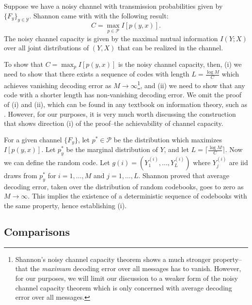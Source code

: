Suppose we have a noisy channel with transmission probabilities given by $\{F_y\}_{y \in \mathcal{Y}}$.
Shannon came with with the following result:
\[
C = \max_{p\in \mathcal{P}} I[p(y, x)].
\]
The noisy channel capacity is given by the maximal mutual information
$I(Y; X)$ over all joint distributions of $(Y, X)$ that can be
realized in the channel.

To show that $C = \max_p I[p(y, x)]$ is the noisy channel capacity,
then, (i) we need to show that there exists a sequence of codes with
length $L = \frac{\log M}{C}$ which achieves vanishing decoding error
as $M \to \infty$\footnote{Shannon's noisy channel capacity theorem
  shows a much stronger property--that the \emph{maximum} decoding
  error over all messages has to vanish.  However, for our purposes,
  we will limit our discussion to a weaker form of the noisy channel
  capacity theorem which is only concerned with average decoding error
  over all messages.}, and (ii) we need to show that any code with a
shorter length has non-vanishing decoding error.  We omit the proof of
(i) and (ii), which can be found in any textbook on information
theory, such as \cite{Cover2006}.  However, for our purposes, it is
very much worth discussing the construction that shows direction (i)
of the proof--the achievability of channel capacity.

For a given channel $\{F_y\}$, let $p^* \in \mathcal{P}$ be the
distribution which maximizes $I[p(y, x)]$.  Let $p^*_y$ be the
marginal distribution of $Y$, and let $L = \lceil \frac{\log M}{C}
\rceil$.  Now we can define the random code.  Let $g(i) =
(Y_1^{(i)},\hdots, Y_L^{(i)})$ where $Y_j^{(i)}$ are iid draws from
$p^*_y$ for $i = 1,\hdots, M$ and $j = 1,\hdots, L$.  Shannon proved
that average decoding error, taken over the distribution of random
codebooks, goes to zero as $M \to \infty$.  This implies the existence
of a deterministic sequence of codebooks with the same property, hence
establishing (i).


\subsection{Comparisons}

